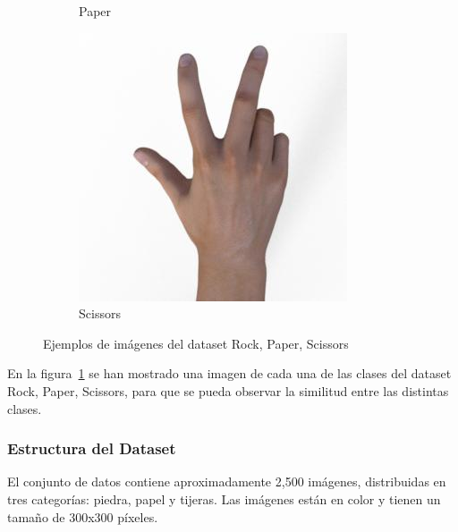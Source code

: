 \begin{figure}[H]
\begin{subfigure}[t]{0.3\textwidth}
        \caption*{Paper}
    \end{subfigure}
    \begin{subfigure}[t]{0.3\textwidth}
        \centering
        \includegraphics[width=\linewidth]{imagenes/dataset_examples/scissors.jpg}
        \caption*{Scissors}
    \end{subfigure}
    \caption{Ejemplos de imágenes del dataset Rock, Paper, Scissors}
    \label{fig:ejemplos-rps}
\end{figure}

En la figura~\ref{fig:ejemplos-rps} se han mostrado una imagen de cada una de las clases del dataset Rock, Paper, Scissors,
para que se pueda observar la similitud entre las distintas clases.

\subsubsection{Estructura del Dataset}
El conjunto de datos contiene aproximadamente 2,500 imágenes, distribuidas en tres categorías: piedra, papel y tijeras.
Las imágenes están en color y tienen un tamaño de 300x300 píxeles.

